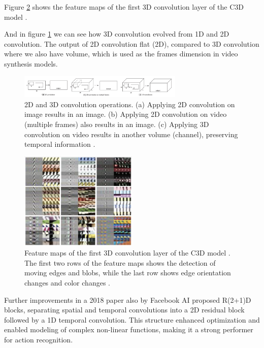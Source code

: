 Figure \ref{fig:c3d_feature_maps} shows the feature maps of the first 3D convolution layer of the C3D model \cite{tran2015learning}.

And in figure \ref{fig:video_synthesis_3d_conv} we can see how 3D convolution evolved from 1D and 2D convolution. The output of 2D convolution flat (2D), compared to 3D convolution where we also have volume, which is used as the frames dimension in video synthesis models.

\begin{figure}
    \centering
    \includegraphics[width=0.7\textwidth]{images/video_synthesis/conv.png}
    \caption{2D and 3D convolution operations. (a) Applying 2D convolution on image results in an image. (b) Applying 2D convolution on video (multiple frames) also results in an image. (c) Applying 3D convolution on video results in another volume (channel), preserving temporal information \cite{tran2015learning}.}
    \label{fig:video_synthesis_3d_conv}
\end{figure}

\begin{figure}
    \centering
    \includegraphics[width=0.5\textwidth]{images/video_synthesis/c3d_feature_maps.png}
    \caption{Feature maps of the first 3D convolution layer of the C3D model \cite{tran2015learning}. The first two rows of the feature maps shows the detection of moving edges and blobs, while the last row shows edge orientation changes and color changes \cite{tran2015learning}.}
    \label{fig:c3d_feature_maps}
\end{figure}

Further improvements in a 2018 paper \cite{tran2018closer} also by Facebook AI proposed R(2+1)D blocks, separating spatial and temporal convolutions into a 2D residual block followed by a 1D temporal convolution. This structure enhanced optimization and enabled modeling of complex non-linear functions, making it a strong performer for action recognition.















